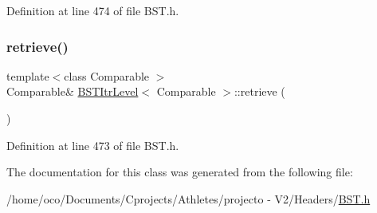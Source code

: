 Definition at line 474 of file B\+S\+T.\+h.

\hypertarget{class_b_s_t_itr_level_a0340bd9f21f72ae25348f383e67e7f91}{}\label{class_b_s_t_itr_level_a0340bd9f21f72ae25348f383e67e7f91} 
\subsubsection{\texorpdfstring{retrieve()}{retrieve()}}
{\footnotesize\ttfamily template$<$class Comparable $>$ \\
Comparable\& \hyperlink{class_b_s_t_itr_level}{B\+S\+T\+Itr\+Level}$<$ Comparable $>$\+::retrieve (\begin{DoxyParamCaption}{ }\end{DoxyParamCaption})\hspace{0.3cm}{\ttfamily [inline]}}



Definition at line 473 of file B\+S\+T.\+h.



The documentation for this class was generated from the following file\+:\begin{DoxyCompactItemize}
\item 
/home/oco/\+Documents/\+Cprojects/\+Athletes/projecto -\/ V2/\+Headers/\hyperlink{_b_s_t_8h}{B\+S\+T.\+h}\end{DoxyCompactItemize}
